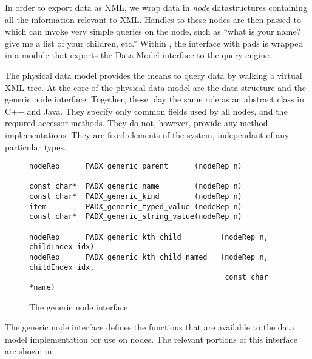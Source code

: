 



In order to export \pads data as XML, we wrap data in {\em node}
datastructures containing all the information relevant to XML. Handles
to these nodes are then passed to \galax which can invoke very simple
queries on the node, such as ``what is your name? give me a list of
your children, etc.''  Within \galax, the interface with pads is
wrapped in a module that exports the \galax Data Model interface to
the \galax query engine.

The physical data model provides the means to query \pads data by
walking a virtual XML tree.  At the core of the physical data model
are the  data structure and the generic node interface.
Together, these play the same role as an abstract class in C++ and
Java. They specify only common fields used by all nodes, and the
required accessor methods. They do not, however, provide any method
implementations. They are fixed elements of the system, independant of
any particular \pads{} types.

\begin{figure*}
{\small
\begin{verbatim}
nodeRep      PADX_generic_parent      (nodeRep n)

const char*  PADX_generic_name        (nodeRep n)
const char*  PADX_generic_kind        (nodeRep n)
item         PADX_generic_typed_value (nodeRep n)
const char*  PADX_generic_string_value(nodeRep n)

nodeRep      PADX_generic_kth_child         (nodeRep n, childIndex idx)
nodeRep      PADX_generic_kth_child_named   (nodeRep n, childIndex idx, 
                                             const char *name)
\end{verbatim}
}
\caption{The generic node interface}
\label{fig:generic-node-interface}
\end{figure*}

The generic node interface defines the functions that are available to the
\pads{} data model implementation for use on nodes. The relevant portions of
this interface are shown in .

